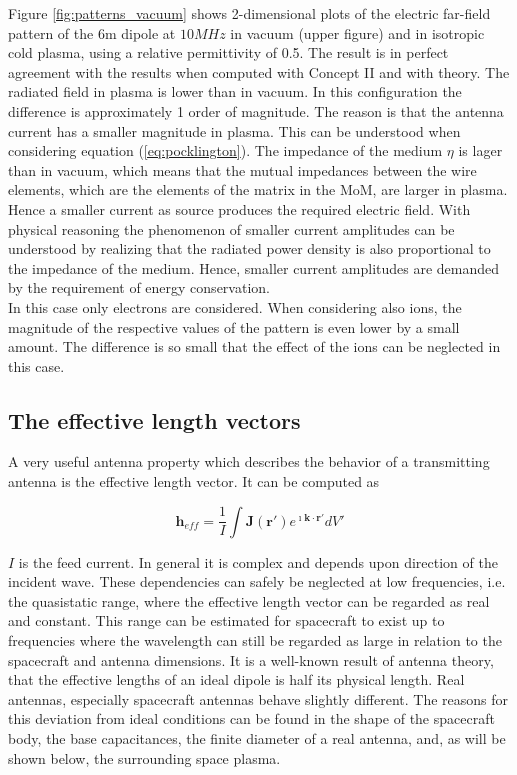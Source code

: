 \documentclass[draft,ras]{agutex}
\begin{document}
\begin{article}
Figure \ref{fig:patterns_vacuum} shows 2-dimensional plots of the electric far-field pattern of the 6m dipole at $10 MHz$ in vacuum (upper figure) and in isotropic cold plasma, using a relative permittivity of 0.5. The result is in perfect agreement with the results when computed with Concept II and with theory. The radiated field in plasma is lower than in vacuum. In this configuration the difference is approximately 1 order of magnitude. The reason is that the antenna current has a smaller magnitude in plasma. This can be understood when considering equation (\ref{eq:pocklington}). The impedance of the medium $\eta$ is lager than in vacuum, which means that the mutual impedances between the wire elements, which are the elements of the matrix in the MoM, are larger in plasma. Hence a smaller current as source produces the required electric field. With physical reasoning the phenomenon of smaller current amplitudes can be understood by realizing that the radiated power density is also proportional to the impedance of the medium. Hence, smaller current amplitudes are demanded by the requirement of energy conservation.\\ 

In this case only electrons are considered. When considering also ions, the magnitude of the respective values of the pattern is even lower by a small amount. The difference is so small that the effect of the ions can be neglected in this case.

\subsection{The effective length vectors}
A very useful antenna property which describes the behavior of a transmitting antenna is the effective length vector. It can be computed as

\begin{equation}\label{eq:heff}
\textbf{h}_{eff}=\frac{1}{I}\int \mathbf{J}(\mathbf{r}')e^{\imath \mathbf{k} \cdot \mathbf{r}'} dV'
 \end{equation}

$I$ is the feed current. In general it is complex and depends upon direction of the incident wave. These dependencies can safely be neglected at low frequencies, i.e. the quasistatic range, where the effective length vector can be regarded as real and constant. This range can be estimated for spacecraft to exist up to frequencies where the wavelength can still be regarded as large in relation to the spacecraft and antenna dimensions. It is a well-known result of antenna theory, that the effective lengths of an ideal dipole is half its physical length. Real antennas, especially spacecraft antennas behave slightly different. The reasons for this deviation from ideal conditions can be found in the shape of the spacecraft body, the base capacitances, the finite diameter of a real antenna, and, as will be shown below, the surrounding space plasma.\\


\end{article}
\end{document}
